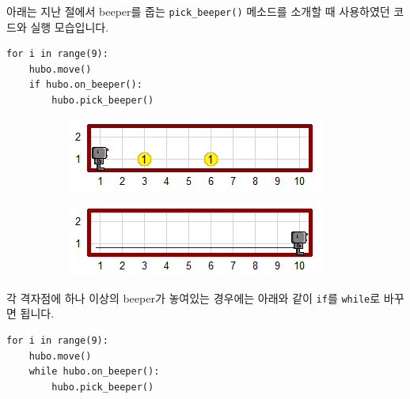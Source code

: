 \documentclass[../main.tex]{subfiles}
\begin{document}
아래는 지난 절에서 beeper를 줍는 \texttt{pick\_beeper()} 메소드를 소개할 때 사용하였던 코드와 실행 모습입니다.
\begin{verbatim}
for i in range(9):
    hubo.move()
    if hubo.on_beeper():
        hubo.pick_beeper()
\end{verbatim}
\begin{figure}[H]
\centering
\begin{subfigure}{.5\textwidth}
\centering
\includegraphics[width=.9\linewidth]{"./lectures/lecture5_pickbeeperbef"}
\label{fig:lecture5pickbeeperbef2}
\end{subfigure}%
\begin{subfigure}{.5\textwidth}
\centering
\includegraphics[width=.9\linewidth]{"./lectures/lecture5_pickbeeperaft"}
\label{fig:lecture5pickbeeperaft2}
\end{subfigure}
\end{figure}
각 격자점에 하나 이상의 beeper가 놓여있는 경우에는 아래와 같이 \texttt{if}를 \texttt{while}로 바꾸면 됩니다.
\begin{verbatim}
for i in range(9):
    hubo.move()
    while hubo.on_beeper():
        hubo.pick_beeper()
\end{verbatim}
\end{document}
